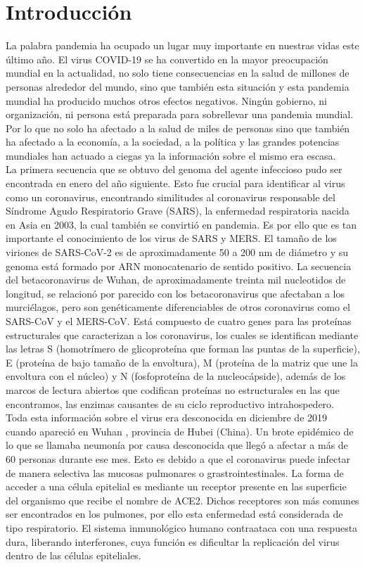 
\section{Introducción}
		La palabra pandemia ha ocupado un lugar muy importante en nuestras vidas este último año. El virus COVID-19 se ha convertido en la mayor preocupación mundial en la actualidad, no solo tiene consecuencias en la salud de millones de personas alrededor del mundo, sino que también esta situación y esta pandemia mundial ha producido muchos otros efectos negativos. Ningún gobierno, ni organización, ni persona está preparada para sobrellevar una pandemia mundial. Por lo que no solo ha afectado a la salud de miles de personas sino que también ha afectado a la economía, a la sociedad, a la política y las grandes potencias mundiales han actuado a ciegas ya la información sobre el mismo era escasa.\\
		
		\noindent La primera secuencia que se obtuvo del genoma del agente infeccioso pudo ser encontrada en enero del año siguiente. Esto fue crucial para identificar al virus como un coronavirus, encontrando similitudes al coronavirus responsable del Síndrome Agudo Respiratorio Grave (SARS), la enfermedad respiratoria nacida en Asia en 2003, la cual también se convirtió en pandemia. Es por ello que es tan importante el conocimiento de los virus de SARS y MERS. El tamaño de los viriones de SARS-CoV-2 es de aproximadamente 50 a 200 nm de diámetro y su genoma está formado por ARN monocatenario de sentido positivo. La secuencia del betacoronavirus de Wuhan, de aproximadamente treinta mil nucleotidos de longitud, se relacionó por parecido con los betacoronavirus que afectaban a los murciélagos, pero son genéticamente diferenciables de otros coronavirus como el SARS-CoV y el MERS-CoV.  Está compuesto de cuatro genes para las proteínas estructurales que caracterizan a los coronavirus, los cuales se identifican mediante las letras S (homotrímero de glicoproteína que forman las puntas de la superficie), E (proteína de bajo tamaño de la envoltura), M (proteína de la matriz que une la envoltura con el núcleo) y N (fosfoproteína de la nucleocápside), además de los marcos de lectura abiertos que codifican proteínas no estructurales en las que encontramos, las enzimas causantes de su ciclo reproductivo intrahospedero. \\
		
		\noindent Toda esta información sobre el virus era desconocida en diciembre de 2019 cuando apareció en Wuhan , provincia de Hubei (China). Un brote epidémico de lo que se llamaba neumonía por causa desconocida que llegó a afectar a más de 60 personas durante ese mes. Esto es debido a que el coronavirus puede infectar de manera selectiva las mucosas pulmonares o grastrointestinales. La forma de acceder a una célula epitelial es mediante un receptor presente en las superficie del organismo que recibe el nombre de ACE2. Dichos receptores son más comunes ser encontrados en los pulmones, por ello esta enfermedad está considerada de tipo respiratorio. El sistema inmunológico humano contraataca con una respuesta dura, liberando interferones, cuya función es dificultar la replicación del virus dentro de las células epiteliales.\\
		
